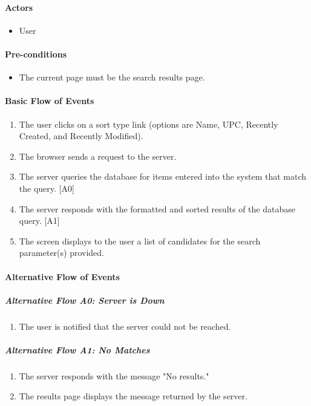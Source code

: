 \documentclass{article}
\begin{document}
\paragraph{Actors}
\begin{itemize}
\item User
\end{itemize}

\paragraph{Pre-conditions}
\begin{itemize}
\item The current page must be the search results page.
\end{itemize}

\paragraph{Basic Flow of Events}
\begin{enumerate}
\item The user clicks on a sort type link (options are Name, UPC, Recently Created, and Recently Modified).
\item The browser sends a request to the server.
\item The server queries the database for items entered into the system that match the query. [A0]
\item The server responds with the formatted and sorted results of the database query. [A1]
\item The screen displays to the user a list of candidates for the search parameter(s) provided.
\end{enumerate}

\paragraph{Alternative Flow of Events}

\subparagraph{Alternative Flow A0: Server is Down}
\begin{enumerate}
\item The user is notified that the server could not be reached.
\end{enumerate}

\subparagraph{Alternative Flow A1: No Matches}
\begin{enumerate}
\item The server responds with the message "No results."
\item The results page displays the message returned by the server.
\end{enumerate}
\end{document}

